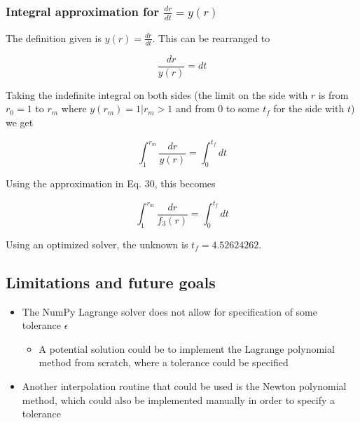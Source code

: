\subsubsection{Integral approximation for \texorpdfstring{$\frac{dr}{dt}=y(r)$}{}}

The definition given is $y(r)=\frac{dr}{dt}$. This can be rearranged to

\begin{equation}
    \frac{dr}{y(r)}=dt
\end{equation}

Taking the indefinite integral on both sides (the limit on the side with $r$ is from $r_0=1$ to $r_m$ where $y(r_m)=1|r_m > 1$ and from $0$ to some $t_f$ for the side with $t$) we get

\begin{equation}
    \int_{1}^{r_m}\frac{dr}{y(r)}=\int_0^{t_f}dt
\end{equation}

Using the approximation in Eq. 30, this becomes

\begin{equation}
    \int_{1}^{r_m}\frac{dr}{f_3(r)}=\int_0^{t_f}dt
\end{equation}

Using an optimized solver, the unknown is $t_f=4.52624262$.

\subsection{Limitations and future goals}

\begin{itemize}
    \item The NumPy Lagrange solver does not allow for specification of some tolerance $\epsilon$
    \begin{itemize}
        \item A potential solution could be to implement the Lagrange polynomial method from scratch, where a tolerance could be specified
    \end{itemize}
    \item Another interpolation routine that could be used is the Newton polynomial method, which could also be implemented manually in order to specify a tolerance
\end{itemize}
